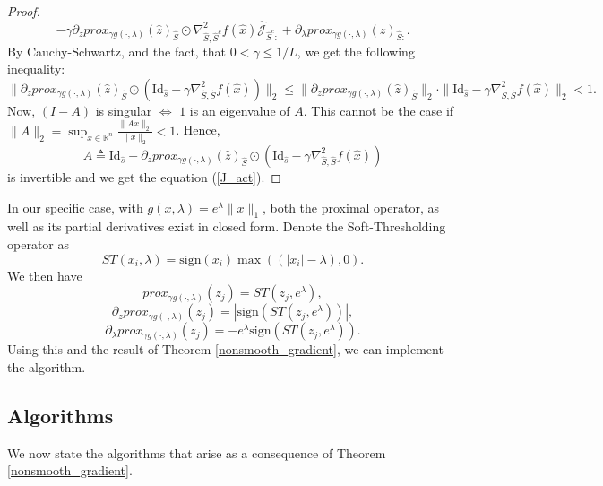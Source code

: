 \documentclass[11pt, twoside]{report}
\begin{document}
\begin{proof}
\begin{equation}
\end{equation}
\[-\gamma \partial_z prox_{\gamma g(\cdot,\lambda)}(\hat{z})_{\hat{S}} \odot \nabla^2_{\hat{S},\hat{S}^c} f(\hat{x}) \hat{\mathcal{J}}_{\hat{S}^c:} + \partial_\lambda prox_{\gamma g(\cdot,\lambda)}(\hat{z})_{\hat{S}:}.\]
By Cauchy-Schwartz, and the fact, that $0 < \gamma \leq 1/L$, we get the following inequality:
\[\|\partial_z prox_{\gamma g(\cdot,\lambda)}(\hat{z})_{\hat{S}} \odot (\mathrm{Id}_{\hat{s}} - \gamma \nabla^2_{\hat{S},\hat{S}} f(\hat{x}))\|_2 \leq \|\partial_z prox_{\gamma g(\cdot,\lambda)}(\hat{z})_{\hat{S}}\|_2 \cdot \|\mathrm{Id}_{\hat{s}} - \gamma \nabla^2_{\hat{S},\hat{S}} f(\hat{x})\|_2 < 1.\]
Now, $(I-A)$ is singular $\iff$ $1$ is an eigenvalue of $A$. This cannot be the case if $\|A\|_2 = \sup_{x \in \mathbb{R}^n} \frac{\|Ax\|_2}{\|x\|_2} < 1$. Hence,
\[A \triangleq \mathrm{Id}_{\hat{s}} - \partial_z prox_{\gamma g(\cdot,\lambda)}(\hat{z})_{\hat{S}} \odot (\mathrm{Id}_{\hat{s}} - \gamma \nabla^2_{\hat{S},\hat{S}} f(\hat{x}))\]
is invertible and we get the equation (\ref{J_act}).
\end{proof}
In our specific case, with $g(x,\lambda) = e^\lambda\|x\|_1$, both the proximal operator, as well as its partial derivatives exist in closed form.
Denote the Soft-Thresholding operator as
\[ST(x_i,\lambda) = \mathrm{sign}(x_i)\max{((|x_i|-\lambda),0)}.\]
We then have
\[prox_{\gamma g(\cdot,\lambda)}(z_j) = ST(z_j,e^\lambda),\]
\[\partial_{z} prox_{\gamma g(\cdot,\lambda)}(z_j) = |\mathrm{sign}(ST(z_j,e^\lambda))|,\]
\[\partial_\lambda prox_{\gamma g(\cdot,\lambda)}(z_j) = -e^\lambda\mathrm{sign}(ST(z_j,e^\lambda)).\]
Using this and the result of Theorem \ref{nonsmooth_gradient}, we can implement the algorithm.

\subsection{Algorithms}
We now state the algorithms that arise as a consequence of Theorem \ref{nonsmooth_gradient}.
\end{document}
